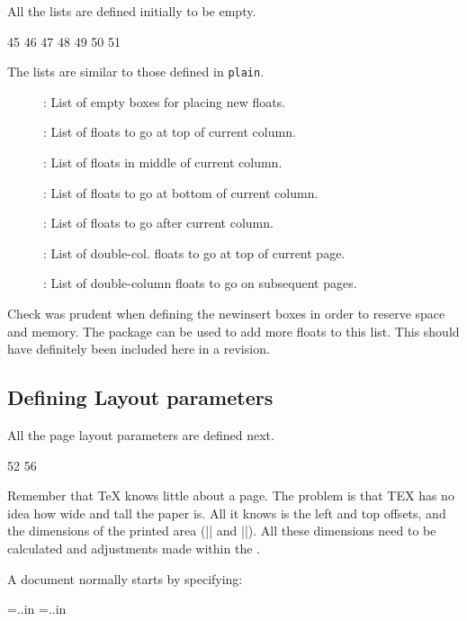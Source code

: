 All the lists are defined initially to be empty.
\begin{teXXX}
45 \gdef\@toplist{}
46 \gdef\@botlist{}
47 \gdef\@midlist{}
48 \gdef\@currlist{}
49 \gdef\@deferlist{}
50 \gdef\@dbltoplist{}
51 \gdef\@dbldeferlist{}
\end{teXXX}


The lists are similar to those defined in \texttt{plain}.

\begin{description}
\item[] : List of empty boxes for placing new 
floats.
\item[\string\@toplist] : List of 
floats to go at top of current column.
\item[\string\@midlist] : List of 
floats in middle of current column.
\item[\string\@botlist] : List of 
floats to go at bottom of current column.
\item[\string\@deferlist] : List of 
floats to go after current column.
\item[\string\@dbltoplist] : List of double-col. 
floats to go at top of current
page.
\item[\string\@dbldeferlist] : List of double-column 
floats to go on subsequent
pages.

\end{description}

\begin{multicols}{2}
Check was prudent when defining the newinsert boxes in order to reserve space and memory. The package  can be used to add more floats to this list. This should have definitely been included here in a revision.

\subsection{Defining Layout parameters} All the page layout parameters are defined next. 

\begin{teXXX}
52 \newdimen{} \newdimen{} \newdimen{} \let\@themargin=\oddsidemargin
56 \newdimen{} \newdimen{} \newdimen{} \newdimen{} \newdimen{} \newdimen{} \newdimen{} \newdimen{} \newdimen{} \newdimen{} \newdimen\marginparpush
\end{teXXX}

Remember  that TeX knows little about a page. The problem is that TEX has no idea how
wide and tall the paper is. All it knows is the
left and top offsets, and the dimensions of the
printed area (|\hsize| and |\vsize|). All these dimensions need to be calculated and adjustments made within the \otr.

A document normally  starts by specifying:

\begin{teXXX}
\newdimen\paperheight
\newdimen\paperwidth
\paperheight=..in \paperwidth=..in
\end{teXXX}


\end{multicols}


